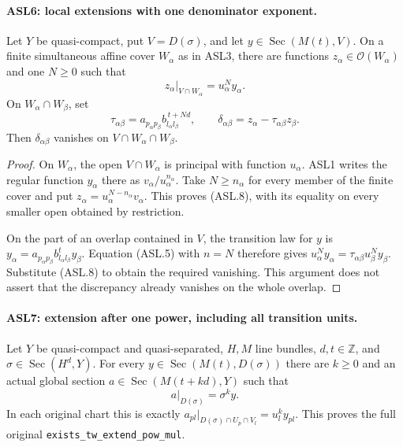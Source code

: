 \paragraph{ASL6: local extensions with one denominator exponent.}
\label{claim:ASL6}
Let $Y$ be quasi-compact, put $V=D(\sigma)$, and let
$y\in\operatorname{Sec}(M(t),V)$.  On a finite simultaneous
affine cover $W_\alpha$ as in ASL3, there are functions
$z_\alpha\in\mathcal O(W_\alpha)$ and one $N\ge0$ such that
\[
 z_\alpha|_{V\cap W_\alpha}
      =u_\alpha^N y_\alpha.                         \tag{ASL.8}
\]
On $W_\alpha\cap W_\beta$, set
\[
 \tau_{\alpha\beta}=a_{p_\alpha p_\beta}
                  b_{l_\alpha l_\beta}^{\,t+Nd},
 \qquad
 \delta_{\alpha\beta}=z_\alpha-\tau_{\alpha\beta}z_\beta.
                                                        \tag{ASL.9}
\]
Then $\delta_{\alpha\beta}$ vanishes on
$V\cap W_\alpha\cap W_\beta$.

\begin{proof}
On $W_\alpha$, the open $V\cap W_\alpha$ is principal with
function $u_\alpha$.  ASL1 writes the regular function
$y_\alpha$ there as $v_\alpha/u_\alpha^{n_\alpha}$.
Take $N\ge n_\alpha$ for every member of the finite cover and
put $z_\alpha=u_\alpha^{N-n_\alpha}v_\alpha$.
This proves (ASL.8), with its equality on every smaller open
obtained by restriction.

On the part of an overlap contained in $V$, the transition law
for $y$ is $y_\alpha=a_{p_\alpha p_\beta}
b_{l_\alpha l_\beta}^{t}y_\beta$.  Equation (ASL.5) with
$n=N$ therefore gives
$u_\alpha^Ny_\alpha=\tau_{\alpha\beta}
u_\beta^Ny_\beta$.  Substitute (ASL.8) to obtain the required
vanishing.  This argument does not assert that the discrepancy
already vanishes on the whole overlap.
\end{proof}

\paragraph{ASL7: extension after one power, including all transition units.}
\label{claim:ASL7}
Let $Y$ be quasi-compact and quasi-separated, $H,M$ line bundles,
$d,t\in\mathbb Z$, and $\sigma\in\operatorname{Sec}(H^d,Y)$.
For every $y\in\operatorname{Sec}(M(t),D(\sigma))$ there are
$k\ge0$ and an actual global section
$a\in\operatorname{Sec}(M(t+kd),Y)$ such that
\[
                  a|_{D(\sigma)}=\sigma^k y.          \tag{ASL.10}
\]
In each original chart this is exactly
$a_{pl}|_{D(\sigma)\cap U_p\cap V_l}=u_l^ky_{pl}$.
This proves the full original \texttt{exists\_\allowbreak{}tw\_\allowbreak{}extend\_\allowbreak{}pow\_\allowbreak{}mul}.

